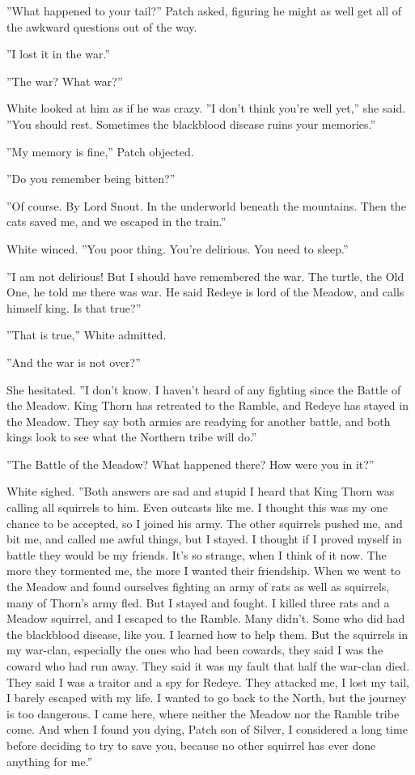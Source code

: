 \documentclass[11pt]{article}
\begin{document}
 ''What happened to your tail?'' Patch asked, figuring he might as well get all of the awkward questions out of the way.\par
 ''I lost it in the war.''\par
 ''The war? What war?''\par
 White looked at him as if he was crazy. ''I don't think you're well yet,'' she said. ''You should rest. Sometimes the blackblood disease ruins your memories.''\par
 ''My memory is fine,'' Patch objected.\par
 ''Do you remember being bitten?''\par
 ''Of course. By Lord Snout. In the underworld beneath the mountains. Then the cats saved me, and we escaped in the train.''\par
 White winced. ''You poor thing. You're delirious. You need to sleep.''\par
 ''I am not delirious! But I should have remembered the war. The turtle, the Old One, he told me there was war. He said Redeye is lord of the Meadow, and calls himself king. Is that true?''\par
 ''That is true,'' White admitted.\par
 ''And the war is not over?''\par
 She hesitated. ''I don't know. I haven't heard of any fighting since the Battle of the Meadow. King Thorn has retreated to the Ramble, and Redeye has stayed in the Meadow. They say both armies are readying for another battle, and both kings look to see what the Northern tribe will do.''\par
 ''The Battle of the Meadow? What happened there? How were you in it?''\par
 White sighed. ''Both answers are sad and stupid %
 I heard that King Thorn was calling all squirrels to him. Even outcasts like me. I thought this was my one chance to be accepted, so I joined his army. The other squirrels pushed me, and bit me, and called me awful things, but I stayed. I thought if I proved myself in battle they would be my friends. It's so strange, when I think of it now. The more they tormented me, the more I wanted their friendship. When we went to the Meadow and found ourselves fighting an army of rats as well as squirrels, many of Thorn's army fled. But I stayed and fought. I killed three rats and a Meadow squirrel, and I escaped to the Ramble. Many didn't. Some who did had the blackblood disease, like you. I learned how to help them. But the squirrels in my war-clan, especially the ones who had been cowards, they said I was the coward who had run away. They said it was my fault that half the war-clan died. They said I was a traitor and a spy for Redeye. They attacked me, I lost my tail, I barely escaped with my life. I wanted to go back to the North, but the journey is too dangerous. I came here, where neither the Meadow nor the Ramble tribe come. And when I found you dying, Patch son of Silver, I considered a long time before deciding to try to save you, because no other squirrel has ever done anything for me.''\par
\end{document}
